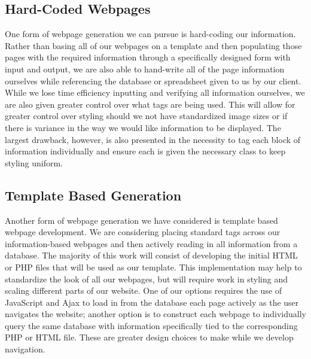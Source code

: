\documentclass[letterpaper,10pt, draftclsnofoot,onecolumn]{IEEEtran}
\begin{document}
{{{{{{{{{{{{{{\subsection[Hard-Coded Webpages]{\color{black}
Hard-Coded Webpages}
{\color{black}\normalsize\noindent
{One form of webpage generation we can pursue is hard-coding our information. 
Rather than basing all of our webpages on a template and then populating those pages with the required information through a specifically designed form with input and output, we are also able to hand-write all of the page information ourselves while referencing the database or spreadsheet given to us by our client.
While we lose time efficiency inputting and verifying all information ourselves, we are also given greater control over what tags are being used. 
This will allow for greater control over styling should we not have standardized image sizes or if there is variance in the way we would like information to be displayed. 
The largest drawback, however, is also presented in the necessity to tag each block of information individually and ensure each is given the necessary class to keep styling uniform.}

\subsection[Template Based Generation]{\color{black}
Template Based Generation}
{\color{black}\normalsize\noindent
{Another form of webpage generation we have considered is template based webpage development.
We are considering placing standard tags across our information-based webpages and then actively reading in all information from a database.
The majority of this work will consist of developing the initial HTML or PHP files that will be used as our template.
This implementation may help to standardize the look of all our webpages, but will require work in styling and scaling different parts of our website\cite{website3}.
One of our options requires the use of JavaScript and Ajax to load in from the database each page actively as the user navigates the website; another option is to construct each webpage to individually query the same database with information specifically tied to the corresponding PHP or HTML file. 
These are greater design choices to make while we develop navigation.}

}}}}}}}}}}}}}}}}
\end{document}
